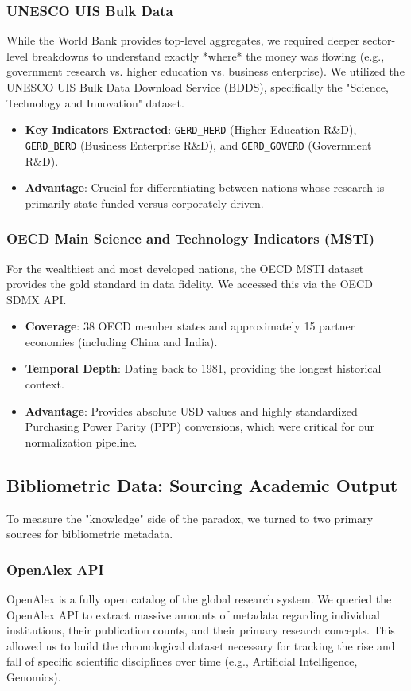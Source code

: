 \documentclass[12pt,a4paper]{article}
\begin{document}
\subsubsection{UNESCO UIS Bulk Data}
While the World Bank provides top-level aggregates, we required deeper sector-level breakdowns to understand exactly *where* the money was flowing (e.g., government research vs. higher education vs. business enterprise). We utilized the UNESCO UIS Bulk Data Download Service (BDDS), specifically the "Science, Technology and Innovation" dataset.
\begin{itemize}
    \item \textbf{Key Indicators Extracted}: \texttt{GERD\_HERD} (Higher Education R\&D), \texttt{GERD\_BERD} (Business Enterprise R\&D), and \texttt{GERD\_GOVERD} (Government R\&D).
    \item \textbf{Advantage}: Crucial for differentiating between nations whose research is primarily state-funded versus corporately driven.
\end{itemize}

\subsubsection{OECD Main Science and Technology Indicators (MSTI)}
For the wealthiest and most developed nations, the OECD MSTI dataset provides the gold standard in data fidelity. We accessed this via the OECD SDMX API.
\begin{itemize}
    \item \textbf{Coverage}: 38 OECD member states and approximately 15 partner economies (including China and India).
    \item \textbf{Temporal Depth}: Dating back to 1981, providing the longest historical context.
    \item \textbf{Advantage}: Provides absolute USD values and highly standardized Purchasing Power Parity (PPP) conversions, which were critical for our normalization pipeline.
\end{itemize}

\subsection{Bibliometric Data: Sourcing Academic Output}
To measure the "knowledge" side of the paradox, we turned to two primary sources for bibliometric metadata.

\subsubsection{OpenAlex API}
OpenAlex is a fully open catalog of the global research system. We queried the OpenAlex API to extract massive amounts of metadata regarding individual institutions, their publication counts, and their primary research concepts. This allowed us to build the chronological dataset necessary for tracking the rise and fall of specific scientific disciplines over time (e.g., Artificial Intelligence, Genomics).
\end{document}
